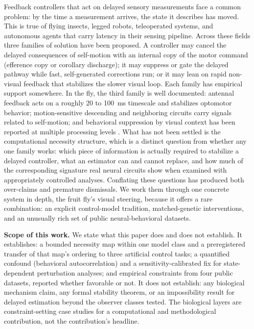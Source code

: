 \documentclass[pdflatex,sn-nature]{sn-jnl}
\begin{document}
Feedback controllers that act on delayed sensory measurements face a common problem: by the time a measurement arrives, the state it describes has moved. This is true of flying insects, legged robots, teleoperated systems, and autonomous agents that carry latency in their sensing pipeline. Across these fields three families of solution have been proposed. A controller may cancel the delayed consequences of self-motion with an internal copy of the motor command (efference copy or corollary discharge); it may suppress or gate the delayed pathway while fast, self-generated corrections run; or it may lean on rapid non-visual feedback that stabilizes the slower visual loop. Each family has empirical support somewhere. In the fly, the third family is well documented: antennal feedback acts on a roughly 20 to 100~ms timescale and stabilizes optomotor behavior; motion-sensitive descending and neighboring circuits carry signals related to self-motion; and behavioral suppression by visual context has been reported at multiple processing levels \cite{fuller2014flying,bartussek2016proprioceptive,sherman2004summation,kim2015cellular,warzecha2000response}. What has not been settled is the computational necessity structure, which is a distinct question from whether any one family works: which piece of information is actually required to stabilize a delayed controller, what an estimator can and cannot replace, and how much of the corresponding signature real neural circuits show when examined with appropriately controlled analyses. Conflating these questions has produced both over-claims and premature dismissals. We work them through one concrete system in depth, the fruit fly's visual steering, because it offers a rare combination: an explicit control-model tradition, matched-genetic interventions, and an unusually rich set of public neural-behavioral datasets.

\textbf{Scope of this work.} We state what this paper does and does not establish. It establishes: a bounded necessity map within one model class and a preregistered transfer of that map's ordering to three artificial control tasks; a quantified confound (behavioral autocorrelation) and a sensitivity-calibrated fix for state-dependent perturbation analyses; and empirical constraints from four public datasets, reported whether favorable or not. It does not establish: any biological mechanism claim, any formal stability theorem, or an impossibility result for delayed estimation beyond the observer classes tested. The biological layers are constraint-setting case studies for a computational and methodological contribution, not the contribution's headline.
\end{document}
